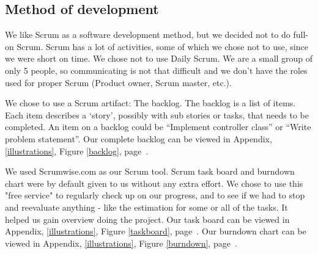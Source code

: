 \subsection{Method of development}
We like Scrum as a software development method, but we decided not to do full-on Scrum. Scrum has a lot of activities, some of which we chose not to use, since we were short on time. We chose not to use Daily Scrum. We are a small group of only 5 people, so communicating is not that difficult and we don't have the roles used for proper Scrum (Product owner, Scrum master, etc.).

We chose to use a Scrum artifact: The backlog. The backlog is a list of items. Each item describes a `story', possibly with sub stories or tasks, that needs to be completed. An item on a backlog could be ``Implement controller class'' or ``Write problem statement''. Our complete backlog can be viewed in Appendix, \ref{illustrations}, Figure \ref{backlog}, page~\pageref{backlog}.

We used Scrumwise.com as our Scrum tool. Scrum task board and burndown chart were by default given to us without any extra effort. We chose to use this "free service" to regularly check up on our progress, and to see if we had to stop and reevaluate anything - like the estimation for some or all of the tasks. It helped us gain overview doing the project. Our task board can be viewed in Appendix, \ref{illustrations}, Figure \ref{taskboard}, page~\pageref{taskboard}. Our burndown chart can be viewed in Appendix, \ref{illustrations}, Figure \ref{burndown}, page~\pageref{burndown}.